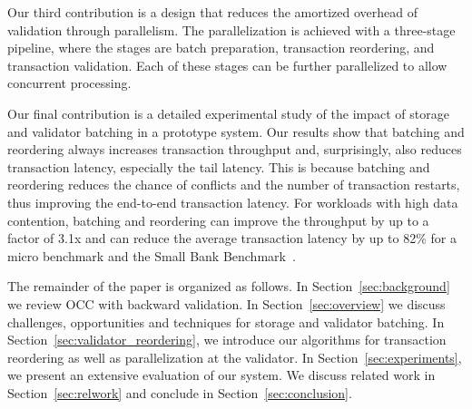 
Our third contribution is a design that reduces the amortized overhead of validation through parallelism. The parallelization is achieved with a three-stage pipeline, where the stages are batch preparation, transaction reordering, and transaction validation. Each of these stages can be further parallelized to allow concurrent processing. 

Our final contribution is a detailed experimental study of the impact of storage and validator batching in a prototype system. Our results show that batching and reordering always increases transaction throughput and, surprisingly, also reduces transaction latency, especially the tail latency. This is because batching and reordering reduces the chance of conflicts and the number of transaction restarts, thus improving the end-to-end transaction latency. For workloads with high data contention, batching and reordering can improve the throughput by up to a factor of 3.1x and can reduce the average transaction latency by up to 82\% for a micro benchmark and the Small Bank Benchmark~\cite{alomari2008icde}.

The remainder of the paper is organized as follows. In Section~\ref{sec:background}  we review OCC with backward validation. In Section~\ref{sec:overview} we discuss challenges, opportunities and techniques for storage and validator batching. In Section~\ref{sec:validator_reordering}, we introduce our algorithms for transaction reordering as well as parallelization at the validator. In Section~\ref{sec:experiments}, we present an extensive evaluation of our system. We discuss related work in Section~\ref{sec:relwork} and conclude in Section~\ref{sec:conclusion}.

